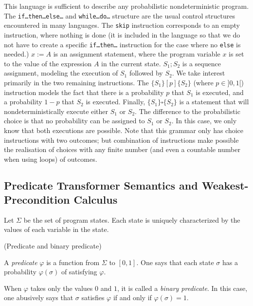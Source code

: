 \documentclass[a4paper,10pt]{llncs}
\begin{document}
This language is sufficient to describe any probabilistic nondeterministic program. The \texttt{if\dots then\dots else\dots} and \texttt{while\dots do\dots} structure are the usual control structures encountered in many languages. The \texttt{skip} instruction corresponds to an empty instruction, where nothing is done (it is included in the language so that we do not have to create a specific \texttt{if\dots then\dots} instruction for the case where no \texttt{else} is needed.) $x := A$ is an assignment statement, where the program variable $x$ is set to the value of the expression $A$ in the current state. $S_1 ; S_2$ is a sequence assignment, modeling the execution of $S_1$ followed by $S_2$. We take interest primarily in the two remaining instructions.\newline
The $\{S_1\} [p] \{S_2\}$ (where $p \in ]0,1[$) instruction models the fact that there is a probability $p$ that $S_1$ is executed, and a probability $1-p$ that $S_2$ is executed. Finally, $\{S_1\} \square \{S_2\} $ is a statement that will nondeterministically execute either $S_1$ or $S_2$. The difference to the probabilistic choice is that no probability can be assigned to $S_1$ or $S_2$. In this case, we only know that both executions are possible.\newline
Note that this grammar only has choice instructions with two outcomes; but combination of instructions make possible the realisation of choices with any finite number (and even a countable number when using loops) of outcomes.\bigskip

	\subsection{Predicate Transformer Semantics and Weakest-Precondition Calculus}
	Let $\Sigma$ be the set of program states. Each state is uniquely characterized by the values of each variable in the state.\bigskip
	
	\begin{definition}{\textnormal{(Predicate and binary predicate)}}
	\item A \emph{predicate} $\varphi$ is a function from $\Sigma$ to $[0,1]$. One says that each state $\sigma$ has a probability $\varphi(\sigma)$ of satisfying $\varphi$.
	\item When $\varphi$ takes only the values $0$ and $1$, it is called a \emph{binary predicate}. In this case, one abusively says that $\sigma$ satisfies $\varphi$ if and only if $\varphi(\sigma) = 1$.
	\end{definition}
\end{document}
